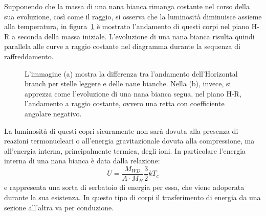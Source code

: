 Supponendo che la massa di una nana bianca rimanga costante nel corso della sua evoluzione, così come il raggio, si osserva che la luminosità diminuisce assieme alla temperatura, in figura~\ref{fig:WD} è mostrato l'andamento di questi corpi nel piano H-R a seconda della massa iniziale. L'evoluzione di una nana bianca risulta quindi parallela alle curve a raggio costante nel diagramma durante la sequenza di raffreddamento.
\begin{figure}
    \centering
     \qquad
    \caption{L'immagine (a) mostra la differenza tra l'andamento dell'Horizontal branch per stelle leggere e delle nane bianche. Nella (b), invece, si apprezza come l'evoluzione di una nana bianca segua, nel piano H-R, l'andamento a raggio costante, ovvero una retta con coefficiente angolare negativo.}\label{fig:WD}
\end{figure}

La luminosità di questi copri sicuramente non sarà dovuta alla presenza di reazioni termonucleari o all'energia gravitazionale dovuta alla compressione, ma all'energia interna, principalmente termica, degli ioni. In particolare l'energia interna di una nana bianca è data dalla relazione:
\[
    U = \frac{M_{WD}}{A \cdot M_{H}} \frac{3}{2} k T_c
\]
e rappresenta una sorta di serbatoio di energia per essa, che viene adoperata durante la sua esistenza. In questo tipo di corpi il trasferimento di energia da una sezione all'altra va per conduzione.

